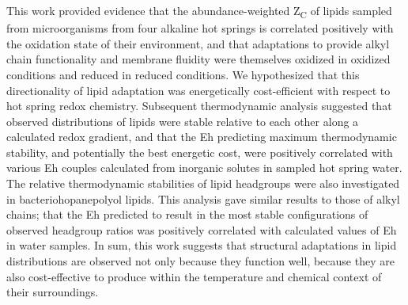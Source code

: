 This work provided evidence that the abundance-weighted Z\textsubscript{C} of lipids sampled from microorganisms from four alkaline hot springs is correlated positively with the oxidation state of their environment, and that adaptations to provide alkyl chain functionality and membrane fluidity were themselves oxidized in oxidized conditions and reduced in reduced conditions. We hypothesized that this directionality of lipid adaptation was energetically cost-efficient with respect to hot spring redox chemistry. Subsequent thermodynamic analysis suggested that observed distributions of lipids were stable relative to each other along a calculated redox gradient, and that the Eh predicting maximum thermodynamic stability, and potentially the best energetic cost, were positively correlated with various Eh couples calculated from inorganic solutes in sampled hot spring water. The relative thermodynamic stabilities of lipid headgroups were also investigated in bacteriohopanepolyol lipids. This analysis gave similar results to those of alkyl chains; that the Eh predicted to result in the most stable configurations of observed headgroup ratios was positively correlated with calculated values of Eh in water samples. In sum, this work suggests that structural adaptations in lipid distributions are observed not only because they function well, because they are also cost-effective to produce within the temperature and chemical context of their surroundings.